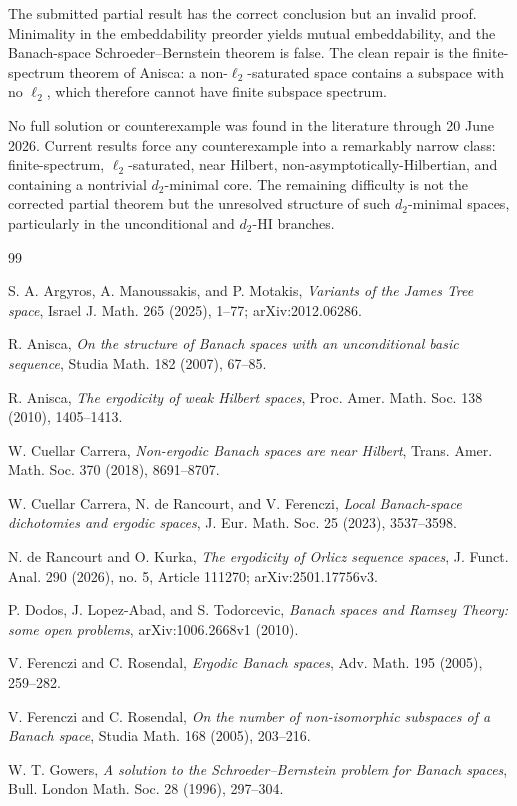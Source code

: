 \documentclass[11pt]{article}
\theoremstyle{definition}
\theoremstyle{remark}
\newcommand{\ellTwo}{\ell_2}
\begin{document}
The submitted partial result has the correct conclusion but an invalid proof.  Minimality in the embeddability preorder yields mutual embeddability, and the Banach-space Schroeder--Bernstein theorem is false.  The clean repair is the finite-spectrum theorem of Anisca: a non-\(\ellTwo\)-saturated space contains a subspace with no \(\ellTwo\), which therefore cannot have finite subspace spectrum.

No full solution or counterexample was found in the literature through 20 June 2026.  Current results force any counterexample into a remarkably narrow class: finite-spectrum, \(\ellTwo\)-saturated, near Hilbert, non-asymptotically-Hilbertian, and containing a nontrivial \(d_2\)-minimal core.  The remaining difficulty is not the corrected partial theorem but the unresolved structure of such \(d_2\)-minimal spaces, particularly in the unconditional and \(d_2\)-HI branches.

\begin{thebibliography}{99}

S. A. Argyros, A. Manoussakis, and P. Motakis,
\emph{Variants of the James Tree space},
Israel J. Math. 265 (2025), 1--77; arXiv:2012.06286.

R. Anisca,
\emph{On the structure of Banach spaces with an unconditional basic sequence},
Studia Math. 182 (2007), 67--85.

R. Anisca,
\emph{The ergodicity of weak Hilbert spaces},
Proc. Amer. Math. Soc. 138 (2010), 1405--1413.

W. Cuellar Carrera,
\emph{Non-ergodic Banach spaces are near Hilbert},
Trans. Amer. Math. Soc. 370 (2018), 8691--8707.

W. Cuellar Carrera, N. de Rancourt, and V. Ferenczi,
\emph{Local Banach-space dichotomies and ergodic spaces},
J. Eur. Math. Soc. 25 (2023), 3537--3598.

N. de Rancourt and O. Kurka,
\emph{The ergodicity of Orlicz sequence spaces},
J. Funct. Anal. 290 (2026), no. 5, Article 111270;
arXiv:2501.17756v3.

P. Dodos, J. Lopez-Abad, and S. Todorcevic,
\emph{Banach spaces and Ramsey Theory: some open problems},
arXiv:1006.2668v1 (2010).

V. Ferenczi and C. Rosendal,
\emph{Ergodic Banach spaces},
Adv. Math. 195 (2005), 259--282.

V. Ferenczi and C. Rosendal,
\emph{On the number of non-isomorphic subspaces of a Banach space},
Studia Math. 168 (2005), 203--216.

W. T. Gowers,
\emph{A solution to the Schroeder--Bernstein problem for Banach spaces},
Bull. London Math. Soc. 28 (1996), 297--304.

\end{thebibliography}
\end{document}
